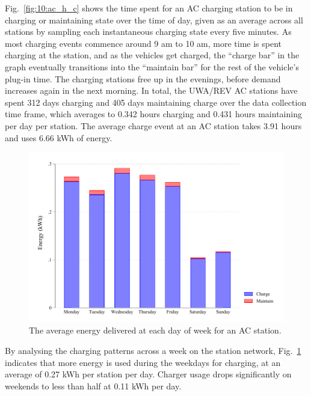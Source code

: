 Fig.~\ref{fig:10:ac_h_c} shows the time spent for an AC charging station to be in charging or maintaining state over the time of day, given as an average across all stations by sampling each instantaneous charging state every five minutes. As most charging events commence around 9 am to 10 am, more time is spent charging at the station, and as the vehicles get charged, the ``charge bar'' in the graph eventually transitions into the ``maintain bar'' for the rest of the vehicle's plug-in time. The charging stations free up in the evenings, before demand increases again in the next morning. In total, the UWA/REV AC stations have spent 312 days charging and 405 days maintaining charge over the data collection time frame, which averages to 0.342 hours charging and 0.431 hours maintaining per day per station. The average charge event at an AC station takes 3.91 hours and uses 6.66 kWh of energy.

\begin{figure}[H]
	\centering
	\includegraphics[width=0.8\linewidth]{ac_d_e}
	\caption[Energy delivered for an AC station for each day of week]{The average energy delivered at each day of week for an AC station.}
	\label{fig:10:ac_d_e}
\end{figure}

By analysing the charging patterns across a week on the station network, Fig.~\ref{fig:10:ac_d_e} indicates that more energy is used during the weekdays for charging, at an average of 0.27 kWh per station per day. Charger usage drops significantly on weekends to less than half at 0.11 kWh per day. 

